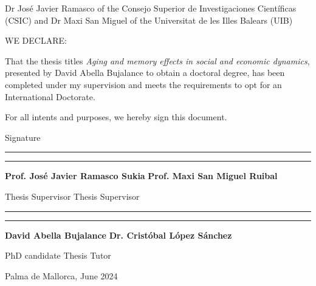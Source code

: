 Dr Jos\'e Javier Ramasco of the Consejo Superior de Investigaciones Cient\'ificas (CSIC) and Dr Maxi San Miguel of the Universitat de les Illes Balears (UIB)

\vspace*{2 cm}

WE DECLARE:

\vspace*{1 cm}

That the thesis titles \textit{Aging and memory effects in social and economic dynamics}, presented by David Abella Bujalance to obtain a doctoral degree, has been completed under my supervision and meets the requirements to opt for an International Doctorate.

\vspace*{1 cm}

For all intents and purposes, we hereby sign this document.

\vspace*{1 cm}

Signature

\vspace*{3.5 cm}

\rule{5.5cm}{0.4pt} \hfill \noindent\rule{5.5cm}{0.4pt}

\vspace*{0.1 cm}

      \textbf{Prof. Jos\'e Javier Ramasco Sukia}              \hfill  \textbf{Prof. Maxi San Miguel Ruibal}


\vspace*{0.1 cm}

        Thesis Supervisor              \hfill Thesis Supervisor

\vspace*{3.5 cm}

\rule{5.5cm}{0.4pt} \hfill \noindent\rule{5.5cm}{0.4pt}

\vspace*{0.1 cm}

\textbf{David Abella Bujalance}              \hfill  \textbf{Dr. Cristóbal López Sánchez}


\vspace*{0.1 cm}

        PhD candidate              \hfill    Thesis Tutor

\vspace*{1 cm}

        Palma de Mallorca, June 2024

\vfill